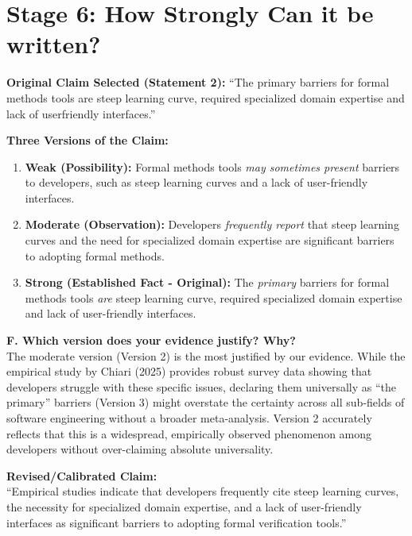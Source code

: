 \documentclass{article}
\begin{document}

\section*{Stage 6: How Strongly Can it be written?}

\textbf{Original Claim Selected (Statement 2):} ``The primary barriers for formal methods tools are steep learning curve, required specialized domain expertise and lack of userfriendly interfaces.''

\vspace{0.5em}
\noindent\textbf{Three Versions of the Claim:}
\begin{enumerate}
    \item \textbf{Weak (Possibility):} Formal methods tools \textit{may sometimes present} barriers to developers, such as steep learning curves and a lack of user-friendly interfaces.
    \item \textbf{Moderate (Observation):} Developers \textit{frequently report} that steep learning curves and the need for specialized domain expertise are significant barriers to adopting formal methods.
    \item \textbf{Strong (Established Fact - Original):} The \textit{primary} barriers for formal methods tools \textit{are} steep learning curve, required specialized domain expertise and lack of user-friendly interfaces.
\end{enumerate}

\vspace{0.5em}
\noindent\textbf{F. Which version does your evidence justify? Why?} \\
The moderate version (Version 2) is the most justified by our evidence. While the empirical study by Chiari (2025) provides robust survey data showing that developers struggle with these specific issues, declaring them universally as ``the primary'' barriers (Version 3) might overstate the certainty across all sub-fields of software engineering without a broader meta-analysis. Version 2 accurately reflects that this is a widespread, empirically observed phenomenon among developers without over-claiming absolute universality.

\vspace{0.5em}
\noindent\textbf{Revised/Calibrated Claim:} \\
``Empirical studies indicate that developers frequently cite steep learning curves, the necessity for specialized domain expertise, and a lack of user-friendly interfaces as significant barriers to adopting formal verification tools.''
\end{document}
